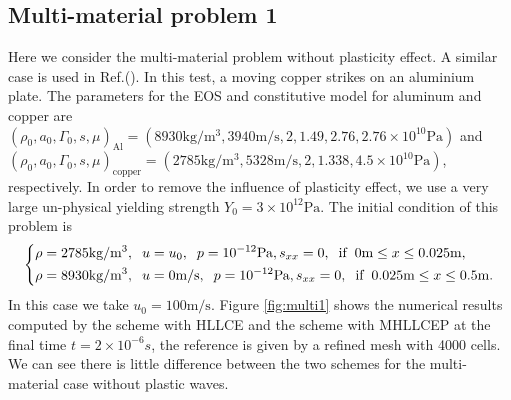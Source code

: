 \documentclass[review]{elsarticle}
\begin{document}
    \subsection{Multi-material problem 1}\label{pro:multi1}
  Here we consider the multi-material problem without plasticity effect. A similar case is used in Ref.(\cite{ghaisas2016high}). In this test, a moving  copper strikes on an aluminium plate. The parameters for the EOS and constitutive model for aluminum and copper  are
$ (\rho_0, a_0, \Gamma_0, s, \mu)_{\text{Al}} =(8930 \text{kg}/\text{m}^3, 3940 \text{m}/\text{s},2, 1.49, 2.76 ,2.76\times 10^{10} \text{Pa} )$ and   $(\rho_0, a_0, \Gamma_0, s, \mu)_{\text{copper}} =(2785 \text{kg}/\text{m}^3, 5328 \text{m}/\text{s},2, 1.338,4.5\times 10^{10}\text{Pa})$, respectively. In order to remove the influence of plasticity effect, we use a very large un-physical yielding strength $Y_0 = 3\times 10^{12} \text{Pa}$.  The initial condition of this problem is 
\begin{equation}\label{eq:initmulti}
  \left\{ \begin{aligned}
    & \rho = 2785 \text{kg}/\text{m}^3, \hspace{0.2cm} u = u_0, \hspace{0.2cm} p = 10^{-12}\text{Pa}, s_{xx} = 0, \hspace{0.2cm} \text{if} \hspace{0.2cm} 0\text{m} \le x \le 0.025 \text{m},\\
    &  \rho = 8930 \text{kg}/\text{m}^3, \hspace{0.2cm} u = 0\text{m}/\text{s}, \hspace{0.2cm} p = 10^{-12}\text{Pa}, s_{xx} = 0, \hspace{0.2cm} \text{if} \hspace{0.2cm} 0.025\text{m} \le x \le 0.5 \text{m}.\\
    \end{aligned}
  \right.
\end{equation}
In this case we take $u_0 = 100 \text{m}/\text{s}$. Figure \ref{fig:multi1}  shows  the numerical results computed by the scheme with HLLCE and the scheme with MHLLCEP at the final time $ t= 2 \times 10^{-6}s$, the reference is given by a refined mesh  with 4000 cells.  We can see there is little difference between the two schemes  for  the multi-material case without plastic waves.
\end{document}
